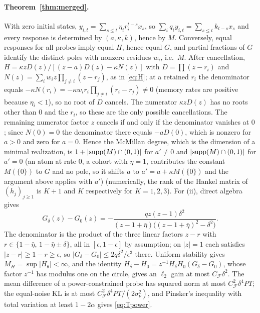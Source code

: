 \documentclass[12pt]{article}
\theoremstyle{definition}
\theoremstyle{remark}
\begin{document}
\paragraph{Theorem~\ref{thm:merged}.} With zero initial states, $y_{i,t}=\sum_{s\le t}\eta_ir_i^{t-s}x_s$, so $\sum_iq_iy_{i,t}=\sum_{s\le t}k_{t-s}x_s$ and every response is determined by $(a,\kappa,k)$, hence by $M$. Conversely, equal responses for all probes imply equal $H$, hence equal $G$, and partial fractions of $G$ identify the distinct poles with nonzero residues $w_i$, i.e.\ $M$. After cancellation, $H=\kappa zD(z)/[(z-a)D(z)-\kappa N(z)]$ with $D=\prod(z-r_i)$ and $N(z)=\sum_iw_iz\prod_{j\ne i}(z-r_j)$, as in \eqref{eq:H}; at a retained $r_i$ the denominator equals $-\kappa N(r_i)=-\kappa w_ir_i\prod_{j\ne i}(r_i-r_j)\neq0$ (memory rates are positive because $\eta_i<1$), so no root of $D$ cancels. The numerator $\kappa zD(z)$ has no roots other than $0$ and the $r_i$, so these are the only possible cancellations. The remaining numerator factor $z$ cancels if and only if the denominator vanishes at $0$; since $N(0)=0$ the denominator there equals $-aD(0)$, which is nonzero for $a>0$ and zero for $a=0$. Hence the McMillan degree, which is the dimension of a minimal realization, is $1+|{\rm supp}(M)\cap(0,1)|$ for $a'\neq0$ and $|{\rm supp}(M)\cap(0,1)|$ for $a'=0$ (an atom at rate $0$, a cohort with $\eta=1$, contributes the constant $M(\{0\})$ to $G$ and no pole, so it shifts $a$ to $a'=a+\kappa M(\{0\})$ and the argument above applies with $a'$) (numerically, the rank of the Hankel matrix of $(h_j)_{j\ge1}$ is $K+1$ and $K$ respectively for $K=1,2,3$). For (ii), direct algebra gives
\[
G_\delta(z)-G_0(z)=-\frac{qz(z-1)\delta^2}{(z-1+\bar\eta)\bigl((z-1+\bar\eta)^2-\delta^2\bigr)} .
\]
The denominator is the product of the three linear factors $z-r$ with $r\in\{1-\bar\eta,\,1-\bar\eta\pm\delta\}$, all in $[\epsilon,1-\epsilon]$ by assumption; on $|z|=1$ each satisfies $|z-r|\ge1-r\ge\epsilon$, so $|G_\delta-G_0|\le2q\delta^2/\epsilon^3$ there. Uniform stability gives $M_H=\sup|H_\theta|<\infty$, and the identity $H_\delta-H_0=z^{-1}H_\delta H_0(G_\delta-G_0)$, whose factor $z^{-1}$ has modulus one on the circle, gives an $\ell_2$ gain at most $C_{\mathcal F}\delta^2$. The mean difference of a power-constrained probe has squared norm at most $C_{\mathcal F}^2\delta^4PT$; the equal-noise KL is at most $C_{\mathcal F}^2\delta^4PT/(2\sigma_\nu^2)$, and Pinsker's inequality with total variation at least $1-2\alpha$ gives \eqref{eq:Tpower}.
\end{document}
